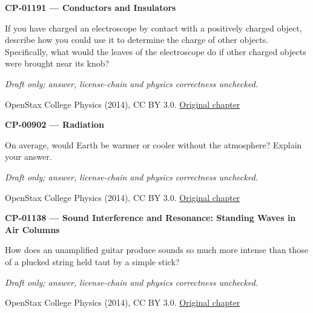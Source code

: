 \par\medskip
\noindent\textbf{CP-01191 — Conductors and Insulators}
\par If you have charged an electroscope by contact with a positively charged object, describe how you could use it to determine the charge of other objects. Specifically, what would the leaves of the electroscope do if other charged objects were brought near its knob?
\par\smallskip
\textit{Draft only; answer, license-chain and physics correctness unchecked.}
\par{\footnotesize OpenStax College Physics (2014), CC BY 3.0. \href{https://github.com/philschatz/physics-book/blob/a7efaa7e221fab1694022d8bb98b83a73ee31d3d/contents/m42306.md}{Original chapter}}\par\normalsize

\par\medskip
\noindent\textbf{CP-00902 — Radiation}
\par On average, would Earth be warmer or cooler without the atmosphere? Explain your answer.
\par\smallskip
\textit{Draft only; answer, license-chain and physics correctness unchecked.}
\par{\footnotesize OpenStax College Physics (2014), CC BY 3.0. \href{https://github.com/philschatz/physics-book/blob/a7efaa7e221fab1694022d8bb98b83a73ee31d3d/contents/m42230.md}{Original chapter}}\par\normalsize

\par\medskip
\noindent\textbf{CP-01138 — Sound Interference and Resonance: Standing Waves in Air Columns}
\par How does an unamplified guitar produce sounds so much more intense than those of a plucked string held taut by a simple stick?
\par\smallskip
\textit{Draft only; answer, license-chain and physics correctness unchecked.}
\par{\footnotesize OpenStax College Physics (2014), CC BY 3.0. \href{https://github.com/philschatz/physics-book/blob/a7efaa7e221fab1694022d8bb98b83a73ee31d3d/contents/m42296.md}{Original chapter}}\par\normalsize

